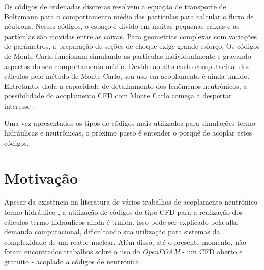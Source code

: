 Os códigos de ordenadas discretas resolvem 
a equação de transporte de Boltzmann para o comportamento médio das partículas para calcular o 
fluxo de nêutrons. Nesses códigos, o espaço é divido em muitas pequenas caixas e as partículas 
são movidas entre as caixas. Para geometrias complexas com variações de parâmetros, a preparação de 
seções de choque exige grande esforço. Os códigos de Monte Carlo funcionam simulando as partículas 
individualmente e gravando aspectos do seu comportamento médio. Devido ao alto custo computacinal 
dos cálculos pelo método de Monte Carlo, seu uso em acoplamento é ainda tímido. Entretanto, dada a capacidade de detalhamento dos fenômenos neutrônicos, a possibilidade do acoplamento CFD com Monte Carlo começa a despertar interesse \cite{Leppanen2012}.

Uma vez apresentados os tipos de códigos mais utilizados para simulações termo-hidráulicas
e neutrônicas, o próximo passo é entender o porquê de acoplar estes códigos.

%

\section{Motivação}

Apesar da existência na literatura de vários trabalhos de acoplamento neutrônico-termo-hidráulico \cite{Faghihi2011}, 
a utilização de códigos do tipo CFD para a realização dos cálculos 
termo-hidráulicos ainda é tímida. Isso pode ser explicado pela alta demanda
computacional, dificultando sua utilização para sistemas da complexidade de um
reator nuclear. Além disso, até o presente momento, não
foram encontrados trabalhos
sobre o uso do \textit{OpenFOAM} - 
um CFD aberto e gratuito \cite{Jasak2007} - acoplado a códigos de neutrônica.

